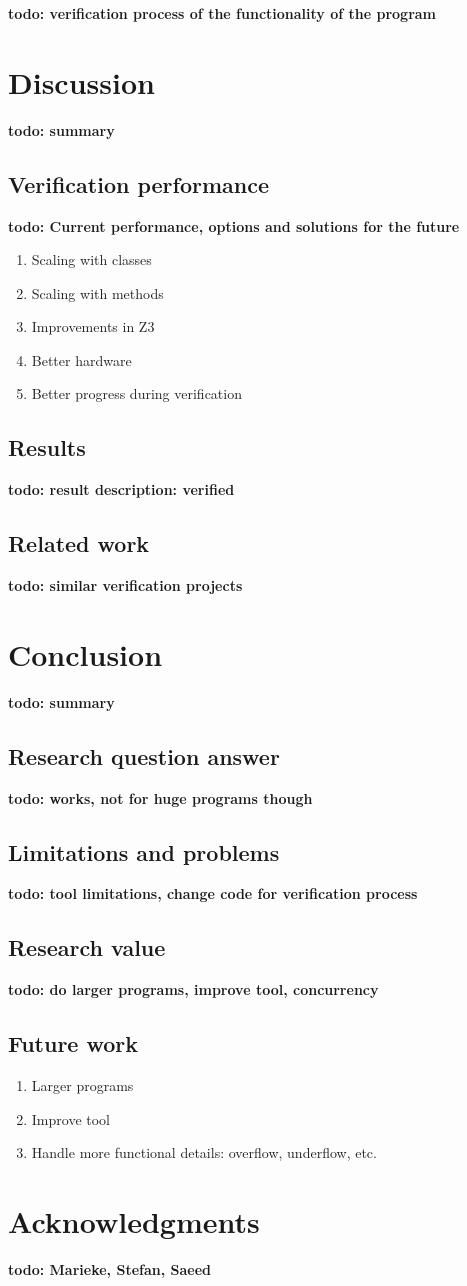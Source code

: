 \documentclass[a4paper]{article}
\newcommand{\todo}[1]{{\color{BurntOrange}\sffamily\textbf{todo: #1}\par}}
\begin{document}
\todo{verification process of the functionality of the program}


\section{Discussion}
\todo{summary}

\subsection{Verification performance}
\todo{Current performance, options and solutions for the future}
\begin{enumerate}
	\item Scaling with classes
	\item Scaling with methods
	\item Improvements in Z3
	\item Better hardware
	\item Better progress during verification
\end{enumerate}

\subsection{Results}

\todo{result description: verified}

\subsection{Related work}
\todo{similar verification projects}


\section{Conclusion}
\todo{summary}

\subsection{Research question answer}
\todo{works, not for huge programs though}

\subsection{Limitations and problems}
\todo{tool limitations, change code for verification process}

\subsection{Research value}
\todo{do larger programs, improve tool, concurrency}

\subsection{Future work}
\begin{enumerate}
	\item Larger programs
	\item Improve tool
	\item Handle more functional details: overflow, underflow, etc.
\end{enumerate}

\section{Acknowledgments}
\todo{Marieke, Stefan, Saeed}




\end{document}
